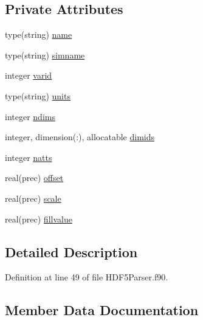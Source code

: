 \subsection*{Private Attributes}
\begin{DoxyCompactItemize}
\item 
type(string) \mbox{\hyperlink{structhdf5parser__mod_1_1var__t_a226fa25884cdec5f1aa1dea1296fcb35}{name}}
\item 
type(string) \mbox{\hyperlink{structhdf5parser__mod_1_1var__t_a0283d5475f7f8327c24bce86532121ce}{simname}}
\item 
integer \mbox{\hyperlink{structhdf5parser__mod_1_1var__t_a083c7d53fa470d9497a4f8217737dc07}{varid}}
\item 
type(string) \mbox{\hyperlink{structhdf5parser__mod_1_1var__t_a24bf07cd3d0ef7ef9485c4b821d45f1b}{units}}
\item 
integer \mbox{\hyperlink{structhdf5parser__mod_1_1var__t_a62e37257fa864160aece69f598ffd8d7}{ndims}}
\item 
integer, dimension(\+:), allocatable \mbox{\hyperlink{structhdf5parser__mod_1_1var__t_aa8c7bd92cbcd7273f3f9dec415e86772}{dimids}}
\item 
integer \mbox{\hyperlink{structhdf5parser__mod_1_1var__t_a92488561e4e57311020a54fdbf8d119a}{natts}}
\item 
real(prec) \mbox{\hyperlink{structhdf5parser__mod_1_1var__t_ade4c6851665438d0dd505547c9dd9aff}{offset}}
\item 
real(prec) \mbox{\hyperlink{structhdf5parser__mod_1_1var__t_a272c24d216c3b0dc554dcbbd24e2c2b2}{scale}}
\item 
real(prec) \mbox{\hyperlink{structhdf5parser__mod_1_1var__t_a9797930ec0a3b3da593f68618098a929}{fillvalue}}
\end{DoxyCompactItemize}


\subsection{Detailed Description}


Definition at line 49 of file H\+D\+F5\+Parser.\+f90.



\subsection{Member Data Documentation}
\mbox{\label{structhdf5parser__mod_1_1var__t_aa8c7bd92cbcd7273f3f9dec415e86772}} 
